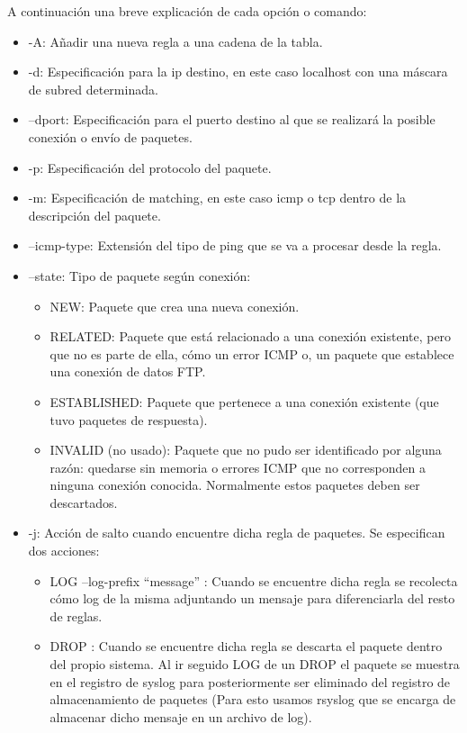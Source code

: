 A continuación una breve explicación de cada opción o comando:
\begin{itemize}
\item -A: Añadir una nueva regla a una cadena de la tabla.
\item -d: Especificación para la ip destino, en este caso localhost con una máscara de subred determinada.
\item --dport: Especificación para el puerto destino al que se realizará la posible conexión o envío de paquetes.
\item -p: Especificación del protocolo del paquete.
\item -m: Especificación de matching, en este caso icmp o tcp dentro de la descripción del paquete.
\item --icmp-type: Extensión del tipo de ping que se va a procesar desde la regla.
\item --state: Tipo de paquete según conexión:
  \begin{itemize}
  \item NEW: Paquete que crea una nueva conexión.
  \item RELATED: Paquete que está relacionado a una conexión existente, pero que no es parte de ella, cómo un error ICMP o, un paquete que establece una conexión de datos FTP.
  \item ESTABLISHED: Paquete que pertenece a una conexión existente (que tuvo paquetes de respuesta).
  \item INVALID (no usado): Paquete que no pudo ser identificado por alguna razón: quedarse sin memoria o errores ICMP que no corresponden a ninguna conexión conocida. Normalmente estos paquetes deben ser descartados.
  \end{itemize}
\item -j: Acción de salto cuando encuentre dicha regla de paquetes. Se especifican dos acciones:
  \begin{itemize}
  \item LOG --log-prefix ``message'' : Cuando se encuentre dicha regla se recolecta cómo log de la misma adjuntando un mensaje para diferenciarla del resto de reglas.
  \item DROP : Cuando se encuentre dicha regla se descarta el paquete dentro del propio sistema. Al ir seguido LOG de un DROP el paquete se muestra en el registro de syslog para posteriormente ser eliminado del registro de almacenamiento de paquetes (Para esto usamos rsyslog que se encarga de almacenar dicho mensaje en un archivo de log).
  \end{itemize}
\end{itemize}

